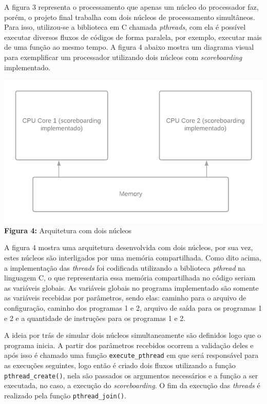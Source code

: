\documentclass[journal]{IEEEtran}
\begin{document}
A figura 3 representa o processamento que apenas um núcleo do processador faz, porém, o projeto final trabalha com dois núcleos de processamento simultâneos. Para isso, utilizou-se a biblioteca em C chamada \textit{pthreads}, com ela é possível executar diversos fluxos de códigos de forma paralela, por exemplo, executar mais de uma função ao mesmo tempo. A figura 4 abaixo mostra um diagrama visual para exemplificar um processador utilizando dois núcleos com \textit{scoreboarding} implementado.

\begin{center}
\includegraphics[scale=0.25]{threads.png}\\
\textbf{Figura 4:} Arquitetura com dois núcleos
\end{center}

A figura 4 mostra uma arquitetura desenvolvida com dois núcleos, por sua vez, estes núcleos são interligados por uma memória compartilhada. Como dito acima, a implementação das \textit{threads} foi codificada utilizando a biblioteca \textit{pthread} na linguagem C, o que representaria essa memória compartilhada no código seriam as variáveis globais. As variáveis globais no programa implementado são somente as variáveis recebidas por parâmetros, sendo elas: caminho para o arquivo de configuração, caminho dos programas 1 e 2, arquivo de saída para os programas 1 e 2 e a quantidade de instruções para os programas 1 e 2.

A ideia por trás de simular dois núcleos simultaneamente são definidos logo que o programa inicia. A partir dos parâmetros recebidos ocorrem a validação deles e após isso é chamado uma função \texttt{execute\_pthread} em que será responsável para as execuções seguintes, logo então é criado dois fluxos utilizando a função \texttt{pthread\_create()}, nela são passados os argumentos necessários e a função a ser executada, no caso, a execução do \textit{scoreboarding}. O fim da execução das \textit{threads} é realizado pela função \texttt{pthread\_join()}.
\end{document}

